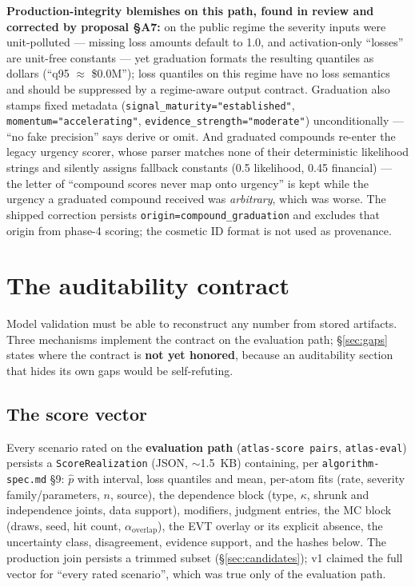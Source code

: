 \documentclass[11pt]{article}
\begin{document}
\textbf{Production-integrity blemishes on this path, found in review and
corrected by proposal \S A7:} on the public regime the severity inputs were
unit-polluted --- missing loss amounts default to 1.0, and activation-only
``losses'' are unit-free constants --- yet graduation formats the resulting
quantiles as dollars (``q95 $\approx$ \$0.0M''); loss quantiles on this
regime have no loss semantics and should be suppressed by a regime-aware
output contract. Graduation also stamps fixed metadata
(\texttt{signal\_maturity="established"}, \texttt{momentum="accelerating"},
\texttt{evidence\_strength="moderate"}) unconditionally --- ``no fake
precision'' says derive or omit. And graduated compounds re-enter the legacy
urgency scorer, whose parser matches none of their deterministic likelihood
strings and silently assigns fallback constants (0.5 likelihood, 0.45
financial) --- the letter of ``compound scores never map onto urgency'' is
kept while the urgency a graduated compound received was \emph{arbitrary},
which was worse. The shipped correction persists
\texttt{origin=compound\_graduation} and excludes that origin from phase-4
scoring; the cosmetic ID format is not used as provenance.

\section{The auditability contract}
\label{sec:contract}

Model validation must be able to reconstruct any number from stored
artifacts. Three mechanisms implement the contract on the evaluation path;
\S\ref{sec:gaps} states where the contract is \textbf{not yet honored},
because an auditability section that hides its own gaps would be
self-refuting.

\subsection{The score vector}
\label{sec:scorevector}

Every scenario rated on the \textbf{evaluation path} (\texttt{atlas-score
pairs}, \texttt{atlas-eval}) persists a \texttt{ScoreRealization} (JSON,
$\sim$1.5~KB) containing, per \texttt{algorithm-spec.md} \S9: $\hat p$ with
interval, loss quantiles and mean, per-atom fits (rate, severity
family/parameters, $n$, source), the dependence block (type, $\kappa$,
shrunk and independence joints, data support), modifiers, judgment entries,
the MC block (draws, seed, hit count, $\alpha_{\mathrm{overlap}}$), the EVT
overlay or its explicit absence, the uncertainty class, disagreement,
evidence support, and the hashes below. The production join persists a
trimmed subset (\S\ref{sec:candidates}); v1 claimed the full vector for
``every rated scenario'', which was true only of the evaluation path.
\end{document}
